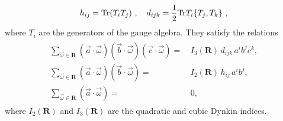 \documentclass[letterpaper, 11pt]{article}
\def\half{\frac{1}{2}}
\def\Tr{{\rm Tr}}
\begin{document}
\begin{align}
 h_{ij} = \Tr (T_i T_j ) \ , \quad
 d_{ijk} = \half \Tr T_i \{T_j,  T_k\} \ , 
\end{align}
where $T_i$ are the generators of the gauge algebra. 
They satisfy the relations
\begin{align}
\begin{split}
   \sum_{\vec{\omega}\in\boldsymbol{R}}(\vec{a}\cdot\vec{\omega})(\vec{b}\cdot\vec{\omega})(\vec{c}\cdot\vec{\omega})=&\,I_3(\boldsymbol{R})\,d_{ijk}\,a^ib^jc^k, \\
   \sum_{\vec{\omega}\in\boldsymbol{R}}(\vec{a}\cdot\vec{\omega})(\vec{b}\cdot\vec{\omega})=&\,I_2(\boldsymbol{R})\,h_{ij}\,a^ib^j,\\
   \sum_{\vec{\omega}\in\boldsymbol{R}}(\vec{a}\cdot\vec{\omega})=&\,0 , 
\end{split}
\end{align}
where $I_2(\mathbf{R})$ and $I_3(\mathbf{R})$ are the quadratic and cubic Dynkin indices. 
\end{document}
